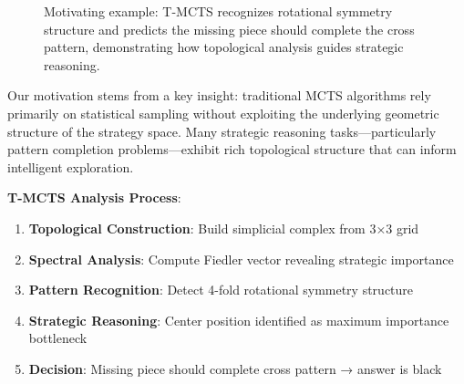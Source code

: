 \documentclass{article}
\begin{document}
\begin{figure}[ht]
\centering
{}
\caption{Motivating example: T-MCTS recognizes rotational symmetry structure and predicts the missing piece should complete the cross pattern, demonstrating how topological analysis guides strategic reasoning.}
\label{fig:motivation}
\end{figure}

Our motivation stems from a key insight: traditional MCTS algorithms rely primarily on statistical sampling without exploiting the underlying geometric structure of the strategy space. Many strategic reasoning tasks—particularly pattern completion problems—exhibit rich topological structure that can inform intelligent exploration.

\textbf{T-MCTS Analysis Process}:

\begin{enumerate}
\item \textbf{Topological Construction}: Build simplicial complex from 3×3 grid
\item \textbf{Spectral Analysis}: Compute Fiedler vector revealing strategic importance
\item \textbf{Pattern Recognition}: Detect 4-fold rotational symmetry structure
\item \textbf{Strategic Reasoning}: Center position identified as maximum importance bottleneck
\item \textbf{Decision}: Missing piece should complete cross pattern → answer is black
\end{enumerate}
\end{document}

